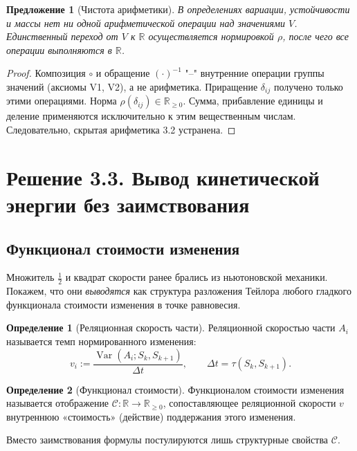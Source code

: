 \documentclass[12pt,a4paper]{article}
\theoremstyle{definition}
\newtheorem{definition}{Определение}[section]
\theoremstyle{plain}
\newtheorem{proposition}{Предложение}[section]
\theoremstyle{remark}
\newcommand{\Values}{V}
\newcommand{\State}{S}
\newcommand{\comp}{\circ}
\newcommand{\norm}{\rho}
\newcommand{\Varr}{\operatorname{Var}}
\newcommand{\Cost}{\mathcal C}
\begin{document}
\begin{proposition}[Чистота арифметики]
В определениях вариации, устойчивости и массы нет ни одной арифметической операции
над значениями $\Values$. Единственный переход от $\Values$ к $\mathbb R$
осуществляется нормировкой $\norm$, после чего все операции выполняются в
$\mathbb R$.
\end{proposition}

\begin{proof}
Композиция $\comp$ и обращение $(\cdot)^{-1}$ "--" внутренние операции группы значений
(аксиомы V1, V2), а не арифметика. Приращение $\delta_{ij}$ получено только этими
операциями. Норма $\norm(\delta_{ij})\in\mathbb R_{\ge0}$. Сумма, прибавление единицы
и деление применяются исключительно к этим вещественным числам. Следовательно,
скрытая арифметика 3.2 устранена.
\end{proof}

\section{Решение 3.3. Вывод кинетической энергии без заимствования}

\subsection{Функционал стоимости изменения}

Множитель $\tfrac12$ и квадрат скорости ранее брались из ньютоновской механики.
Покажем, что они \emph{выводятся} как структура разложения Тейлора любого гладкого
функционала стоимости изменения в точке равновесия.

\begin{definition}[Реляционная скорость части]
Реляционной скоростью части $A_i$ называется темп нормированного изменения:
\[
v_i:=\frac{\Varr(A_i;\State_k,\State_{k+1})}{\Delta t},\qquad \Delta t=\tau(\State_k,\State_{k+1}).
\]
\end{definition}

\begin{definition}[Функционал стоимости]
Функционалом стоимости изменения называется отображение
$\Cost:\mathbb R\to\mathbb R_{\ge0}$, сопоставляющее реляционной скорости $v$
внутреннюю «стоимость» (действие) поддержания этого изменения.
\end{definition}

Вместо заимствования формулы постулируются лишь структурные свойства $\Cost$.
\end{document}
